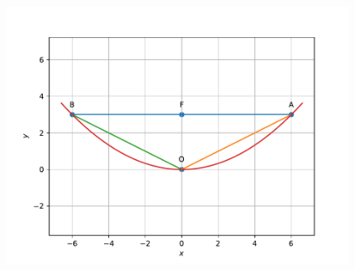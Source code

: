     \begin{figure}[!ht]
        \centering
        \includegraphics[width=\columnwidth]{chapters/11/11/5/6/figs/fig1.pdf}
        \caption{}
        \label{fig:chapters/11/11/5/6/parabola}
    \end{figure}
